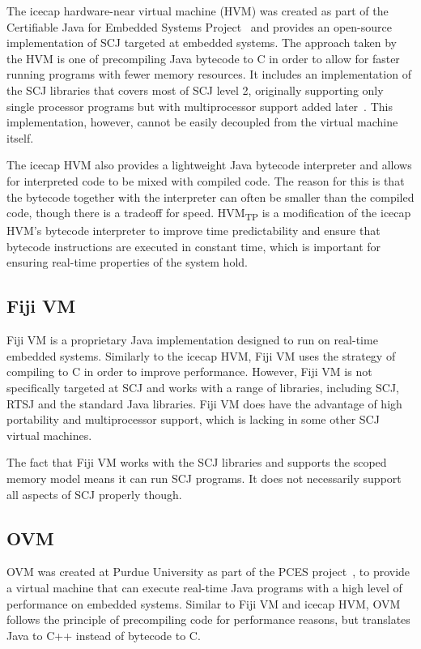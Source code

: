 The icecap hardware-near virtual machine (HVM) was created as part of
the Certifiable Java for Embedded Systems Project~\cite{schoeberl2014}
and provides an open-source implementation of SCJ targeted at embedded
systems.
The approach taken by the HVM is one of precompiling Java bytecode to
C in order to allow for faster running programs with fewer memory
resources.
It includes an implementation of the SCJ libraries that covers most of
SCJ level 2, originally supporting only single processor programs but
with multiprocessor support added later~\cite{zhao2015}.
This implementation, however, cannot be easily decoupled from the
virtual machine itself.

The icecap HVM also provides a lightweight Java bytecode interpreter
and allows for interpreted code to be mixed with compiled code.
The reason for this is that the bytecode together with the interpreter
can often be smaller than the compiled code, though there is a
tradeoff for speed.
HVM\textsubscript{TP} is a modification of the icecap HVM's bytecode
interpreter to improve time predictability and ensure that bytecode
instructions are executed in constant time, which is important for
ensuring real-time properties of the system hold.

\subsection{Fiji VM}

Fiji VM is a proprietary Java implementation designed to run on
real-time embedded systems.
Similarly to the icecap HVM, Fiji VM uses the strategy of compiling to
C in order to improve performance.
However, Fiji VM is not specifically targeted at SCJ and works with a
range of libraries, including SCJ, RTSJ and the standard Java
libraries.
Fiji VM does have the advantage of high portability and multiprocessor
support, which is lacking in some other SCJ virtual machines.

The fact that Fiji VM works with the SCJ libraries and supports the
scoped memory model means it can run SCJ programs.
It does not necessarily support all aspects of SCJ properly though.

\subsection{OVM}

OVM was created at Purdue University as part of the PCES
project~\cite{baker2006}, to provide a virtual machine that can
execute real-time Java programs with a high level of performance on
embedded systems.
Similar to Fiji VM and icecap HVM, OVM follows the principle of
precompiling code for performance reasons, but translates Java to C++
instead of bytecode to C.

